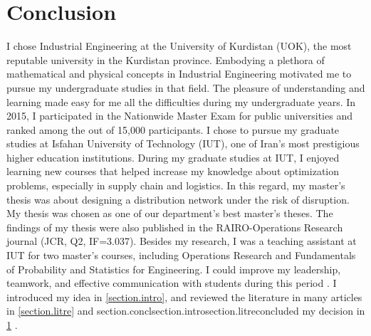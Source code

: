 \documentclass[11pt,a4paper,twocolumn]{article}
\begin{document}
\section{Conclusion}\label{section.concl}
I chose Industrial Engineering at the University of Kurdistan (UOK), the most reputable university in the Kurdistan province. Embodying a plethora of mathematical and physical concepts in Industrial Engineering motivated me to pursue my undergraduate studies in that field. The pleasure of understanding and learning made easy for me all the difficulties during my undergraduate years. In 2015, I participated in the Nationwide Master Exam for public universities and ranked among the out of 15,000 participants. I chose to pursue my graduate studies at Isfahan University of Technology (IUT), one of Iran's most prestigious higher education institutions. During my graduate studies at IUT, I enjoyed learning new courses that helped increase my knowledge about optimization problems, especially in supply chain and logistics. In this regard, my master's thesis was about designing a distribution network under the risk of disruption. My thesis was chosen as one of our department's best master's theses. The findings of my thesis were also published in the RAIRO-Operations Research journal (JCR, Q2, IF=3.037). Besides my research, I was a teaching assistant at IUT for two master's courses, including Operations Research and Fundamentals of Probability and Statistics for Engineering. I could improve my leadership, teamwork, and effective communication with students during this period \cite{dehghan2021capacitated}.
I introduced my idea in \ref{section.intro}, and reviewed the literature in many articles in \ref{section.litre} and section.conclsection.introsection.litreconcluded my decision in \ref{section.concl} \cite{mohammadi2022bi}.

\newpage

%
%
%

\end{document}
